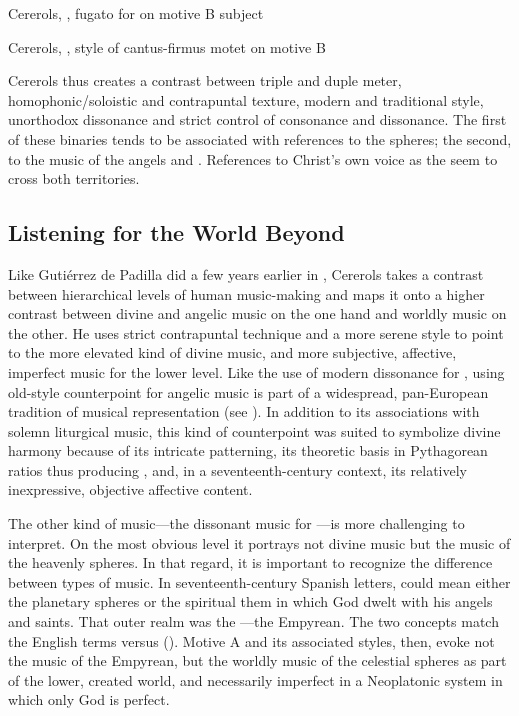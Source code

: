 {Cererols, , fugato  for  on motive B subject}

{Cererols, , style of cantus-firmus motet on motive B}

Cererols thus creates a contrast between triple and duple meter,
homophonic/soloistic and contrapuntal texture, modern and traditional style,
unorthodox dissonance and strict control of consonance and dissonance.
The first of these binaries tends to be associated with references to the
spheres; the second, to the music of the angels and . 
References to Christ's own voice as the  seem to cross both
territories.

\subsection{Listening for the World Beyond}

Like Gutiérrez de Padilla did a few years earlier in , Cererols takes a contrast between hierarchical levels of human
music-making and maps it onto a higher contrast between divine and angelic music
on the one hand and worldly music on the other.
He uses strict contrapuntal technique and a more serene style to point to the
more elevated kind of divine music, and more subjective, affective,
imperfect music for the lower level.
Like the use of modern dissonance for , using old-style
counterpoint for angelic music is part of a widespread, pan-European tradition
of musical representation (see ).
In addition to its associations with solemn liturgical music, this kind of
counterpoint was suited to symbolize divine harmony because of its intricate
patterning, its theoretic basis in Pythagorean ratios thus producing
, and, in a seventeenth-century context, its relatively
inexpressive, objective affective content.

The other kind of music---the dissonant music for ---is more challenging to interpret.
On the most obvious level it portrays not divine music but the music of the
heavenly spheres.
In that regard, it is important to recognize the difference between types of
 music.
In seventeenth-century Spanish letters,  could mean either the
planetary spheres or the spiritual  them in which God dwelt
with his angels and saints.
That outer realm was the ---the Empyrean.
The two concepts match the English terms  versus
 ().
Motive A and its associated styles, then, evoke not the music of the Empyrean,
but the worldly music of the celestial spheres as part of the lower, created
world, and necessarily imperfect in a Neoplatonic system in which only God is
perfect.

